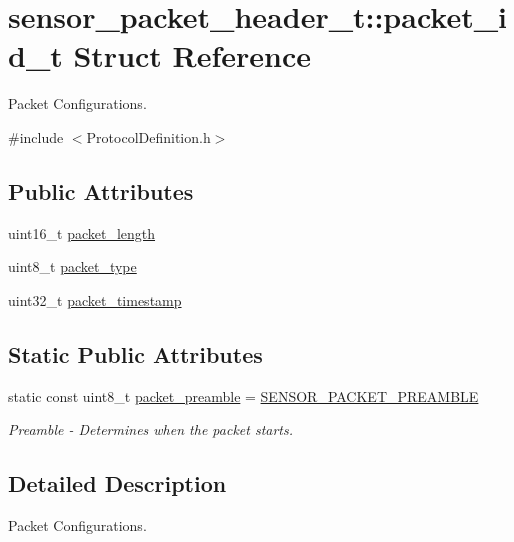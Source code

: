 \hypertarget{structsensor__packet__header__t_1_1packet__id__t}{\section{sensor\-\_\-packet\-\_\-header\-\_\-t\-:\-:packet\-\_\-id\-\_\-t \-Struct \-Reference}
\label{structsensor__packet__header__t_1_1packet__id__t}
}


\-Packet \-Configurations.  




{\ttfamily \#include $<$\-Protocol\-Definition.\-h$>$}

\subsection*{\-Public \-Attributes}
\begin{DoxyCompactItemize}
\item 
uint16\-\_\-t \hyperlink{structsensor__packet__header__t_1_1packet__id__t_a3ece38a344ef1b83c673d7e2e0b83f6f}{packet\-\_\-length}
\item 
uint8\-\_\-t \hyperlink{structsensor__packet__header__t_1_1packet__id__t_a653b5259acc7c834d3afc90ee1abed8a}{packet\-\_\-type}
\item 
uint32\-\_\-t \hyperlink{structsensor__packet__header__t_1_1packet__id__t_a1b3a838cb32f36a3e72a4322c6c37a8d}{packet\-\_\-timestamp}
\end{DoxyCompactItemize}
\subsection*{\-Static \-Public \-Attributes}
\begin{DoxyCompactItemize}
\item 
static const uint8\-\_\-t \hyperlink{structsensor__packet__header__t_1_1packet__id__t_acf0b5180e1e77ceb3817aa7d2a56af01}{packet\-\_\-preamble} = \hyperlink{_protocol_definition_8h_ae1c904c44f56120621316230be76a648}{\-S\-E\-N\-S\-O\-R\-\_\-\-P\-A\-C\-K\-E\-T\-\_\-\-P\-R\-E\-A\-M\-B\-L\-E}
\begin{DoxyCompactList}\small\item\em \-Preamble -\/ \-Determines when the packet starts. \end{DoxyCompactList}\end{DoxyCompactItemize}


\subsection{\-Detailed \-Description}
\-Packet \-Configurations. 

